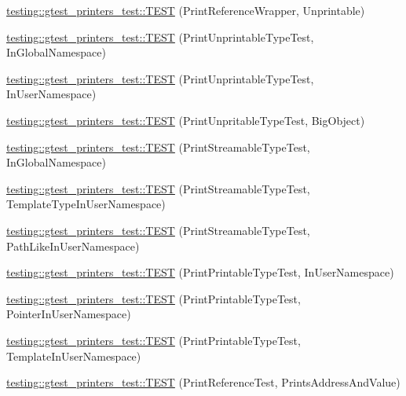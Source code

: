 \begin{DoxyCompactItemize}
\item 
\mbox{\hyperlink{namespacetesting_1_1gtest__printers__test_a0f935a13826edbe21933d5698c1dbf2e}{testing\+::gtest\+\_\+printers\+\_\+test\+::\+T\+E\+ST}} (Print\+Reference\+Wrapper, Unprintable)
\item 
\mbox{\hyperlink{namespacetesting_1_1gtest__printers__test_a805264fd24de8e65cba977a798abc54c}{testing\+::gtest\+\_\+printers\+\_\+test\+::\+T\+E\+ST}} (Print\+Unprintable\+Type\+Test, In\+Global\+Namespace)
\item 
\mbox{\hyperlink{namespacetesting_1_1gtest__printers__test_a0aa1499e978bdde6c71e49ecc9db695b}{testing\+::gtest\+\_\+printers\+\_\+test\+::\+T\+E\+ST}} (Print\+Unprintable\+Type\+Test, In\+User\+Namespace)
\item 
\mbox{\hyperlink{namespacetesting_1_1gtest__printers__test_a6b6fba2a191094244f8aa78a4933a2c5}{testing\+::gtest\+\_\+printers\+\_\+test\+::\+T\+E\+ST}} (Print\+Unpritable\+Type\+Test, Big\+Object)
\item 
\mbox{\hyperlink{namespacetesting_1_1gtest__printers__test_a80fe9d71227a97b12fd5336a823c3d17}{testing\+::gtest\+\_\+printers\+\_\+test\+::\+T\+E\+ST}} (Print\+Streamable\+Type\+Test, In\+Global\+Namespace)
\item 
\mbox{\hyperlink{namespacetesting_1_1gtest__printers__test_a8ccd96504d676671a0429073d5012ff1}{testing\+::gtest\+\_\+printers\+\_\+test\+::\+T\+E\+ST}} (Print\+Streamable\+Type\+Test, Template\+Type\+In\+User\+Namespace)
\item 
\mbox{\hyperlink{namespacetesting_1_1gtest__printers__test_a243b88c8a03fb501c573c25da302ca98}{testing\+::gtest\+\_\+printers\+\_\+test\+::\+T\+E\+ST}} (Print\+Streamable\+Type\+Test, Path\+Like\+In\+User\+Namespace)
\item 
\mbox{\hyperlink{namespacetesting_1_1gtest__printers__test_a52f5df394111bcc55aecc59ce426088d}{testing\+::gtest\+\_\+printers\+\_\+test\+::\+T\+E\+ST}} (Print\+Printable\+Type\+Test, In\+User\+Namespace)
\item 
\mbox{\hyperlink{namespacetesting_1_1gtest__printers__test_a3da6191eff6b016540024c2bfccdd90b}{testing\+::gtest\+\_\+printers\+\_\+test\+::\+T\+E\+ST}} (Print\+Printable\+Type\+Test, Pointer\+In\+User\+Namespace)
\item 
\mbox{\hyperlink{namespacetesting_1_1gtest__printers__test_aa697a3cf25b7f51f26ab49ed8ac3dd31}{testing\+::gtest\+\_\+printers\+\_\+test\+::\+T\+E\+ST}} (Print\+Printable\+Type\+Test, Template\+In\+User\+Namespace)
\item 
\mbox{\hyperlink{namespacetesting_1_1gtest__printers__test_aeae9b61a9fe582c72580db1466631846}{testing\+::gtest\+\_\+printers\+\_\+test\+::\+T\+E\+ST}} (Print\+Reference\+Test, Prints\+Address\+And\+Value)

\end{DoxyCompactItemize}
